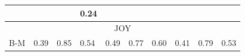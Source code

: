 \documentclass[11pt]{article}
\begin{document}
\begin{table}[!h]
\begin{tabular}{|l||l|l|l||l|l|l||l|l|l|}
\hline
    \tiny{\cite{danisman2008feeler} } &
    \footnotesize{} & 
    \footnotesize{} & 
    \footnotesize{0.24} &
    \footnotesize{} & 
    \footnotesize{} & 
    \footnotesize{} &
    \footnotesize{} & 
    \footnotesize{} & 
    \footnotesize{} \\


%
%
%
%
%
%
%

\hline
\hline

    \multicolumn{10}{|c|}{{JOY}} \\ 

\hline
    \tiny{B-M} & 
    \footnotesize{0.39} & 
    \footnotesize{0.85} & 
    \footnotesize{0.54} & 
    \footnotesize{0.49} & 
    \footnotesize{{0.77}} & 
    \footnotesize{0.60} & 
    \footnotesize{{0.41}} & 
    \footnotesize{{0.79}} & 
    \footnotesize{{0.53}} \\ 


\end{tabular}
\end{table}
\end{document}
